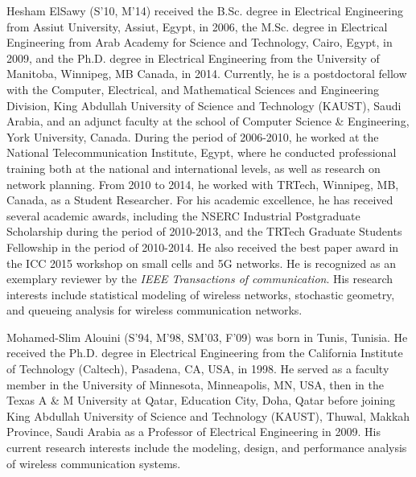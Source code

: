 \documentclass[10pt, letter,twocolumn]{IEEEtran}
\begin{document}
\begin{IEEEbiography}{Hesham ElSawy} (S'10, M'14) received the B.Sc. degree in Electrical Engineering from Assiut University, Assiut, Egypt, in 2006, the M.Sc. degree in Electrical Engineering from Arab Academy for Science and Technology, Cairo, Egypt, in 2009, and the Ph.D. degree in Electrical Engineering from the University of Manitoba, Winnipeg, MB Canada, in 2014. Currently, he is a postdoctoral fellow with the Computer, Electrical, and Mathematical Sciences and Engineering Division, King Abdullah University of Science and Technology (KAUST), Saudi Arabia, and an adjunct faculty at the school of Computer Science \& Engineering, York University, Canada. During the period of 2006-2010, he worked at the National Telecommunication Institute, Egypt, where he conducted professional training both at the national and international levels, as well as research on network planning. From 2010 to 2014, he worked with TRTech, Winnipeg, MB, Canada, as a Student Researcher. For his academic excellence, he has received several academic awards, including the NSERC Industrial Postgraduate Scholarship during the period of 2010-2013, and the TRTech Graduate Students Fellowship in the period of 2010-2014. He also received the best paper award in the ICC 2015 workshop on small cells and 5G networks. He is recognized as an exemplary reviewer by the {\em IEEE Transactions of communication}. His research interests include statistical modeling of wireless networks, stochastic geometry, and queueing analysis for wireless communication networks.
\end{IEEEbiography}


\begin{IEEEbiography}{Mohamed-Slim Alouini}
(S'94, M'98, SM'03, F'09) was born in Tunis, Tunisia. He received the Ph.D. degree in Electrical Engineering from the California Institute of Technology (Caltech), Pasadena, CA, USA, in 1998. He served as a faculty member in the University of Minnesota, Minneapolis, MN, USA, then in the Texas A \& M University at Qatar, Education City, Doha, Qatar before joining King Abdullah University of Science and Technology (KAUST), Thuwal, Makkah Province, Saudi Arabia as a Professor of Electrical Engineering in 2009. His current research interests include the modeling, design, and performance analysis of wireless communication systems.
\end{IEEEbiography}
\end{document}
